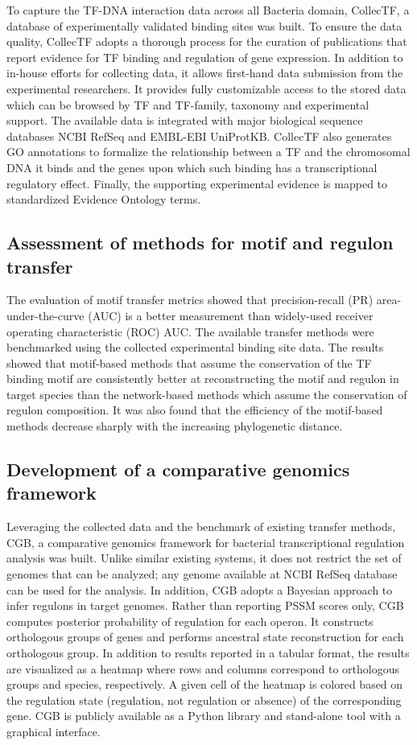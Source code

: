 \documentclass[12pt]{article}
\begin{document}
To capture the TF-DNA interaction data across all Bacteria domain, CollecTF, a
database of experimentally validated binding sites was built. To ensure the
data quality, CollecTF adopts a thorough process for the curation of
publications that report evidence for TF binding and regulation of gene
expression. In addition to in-house efforts for collecting data, it allows
first-hand data submission from the experimental researchers. It provides fully
customizable access to the stored data which can be browsed by TF and
TF-family, taxonomy and experimental support. The available data is integrated
with major biological sequence databases NCBI RefSeq and EMBL-EBI
UniProtKB\-. CollecTF also generates GO annotations to formalize the relationship
between a TF and the chromosomal DNA it binds and the genes upon which such
binding has a transcriptional regulatory effect. Finally, the supporting experimental
evidence is mapped to standardized Evidence Ontology terms.

\subsection{Assessment of methods for motif and regulon transfer}

The evaluation of motif transfer metrics showed that precision-recall (PR)
area-under-the-curve (AUC) is a better measurement than widely-used receiver
operating characteristic (ROC) AUC\@. The available transfer methods were
benchmarked using the collected experimental binding site data. The results
showed that motif-based methods that assume the conservation of the TF binding
motif are consistently better at reconstructing the motif and regulon in target
species than the network-based methods which assume the conservation of regulon
composition. It was also found that the efficiency of the motif-based methods
decrease sharply with the increasing phylogenetic distance.

\subsection{Development of a comparative genomics framework}

Leveraging the collected data and the benchmark of existing transfer methods,
CGB, a comparative genomics framework for bacterial transcriptional regulation
analysis was built. Unlike similar existing systems, it does not restrict the
set of genomes that can be analyzed; any genome available at NCBI RefSeq
database can be used for the analysis. In addition, CGB adopts a Bayesian
approach to infer regulons in target genomes. Rather than reporting PSSM scores
only, CGB computes posterior probability of regulation for each operon. It
constructs orthologous groups of genes and performs ancestral state
reconstruction for each orthologous group. In addition to results reported in a
tabular format, the results are visualized as a heatmap where rows and columns
correspond to orthologous groups and species, respectively. A given cell of the
heatmap is colored based on the regulation state (regulation, not regulation or
absence) of the corresponding gene. CGB is publicly available as a Python
library and stand-alone tool with a graphical interface.
\end{document}

